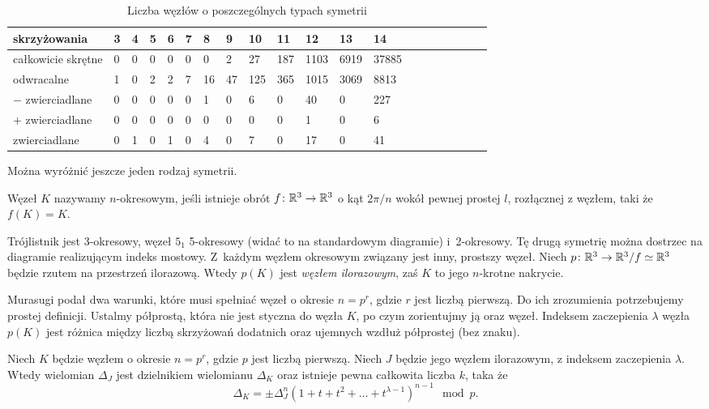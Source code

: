 \begin{table}[h]
    \centering
    \begin{tabular}{@{}*{20}l@{}} \toprule
        skrzyżowania & 3 & 4 & 5 & 6 & 7 & 8 & 9 & 10 & 11 & 12 & 13 & 14 \\ \midrule
        całkowicie skrętne & 0 & 0 & 0 & 0 & 0 & 0 & 2 & 27 & 187 & 1103 & 6919 & 37885 \\
        odwracalne & 1 & 0 & 2 & 2 & 7 & 16 & 47 & 125 & 365 & 1015 & 3069 & 8813 \\
        $-$ zwierciadlane & 0 & 0 & 0 & 0 & 0 & 1 & 0 & 6 & 0 & 40 & 0 & 227 \\
        $+$ zwierciadlane & 0 & 0 & 0 & 0 & 0 & 0 & 0 & 0 & 0 & 1 & 0 & 6 \\
        zwierciadlane & 0 & 1 & 0 & 1 & 0 & 4 & 0 & 7 & 0 & 17 & 0 & 41 \\
        \bottomrule
        \hline
    \end{tabular}
    \caption{Liczba węzłów o poszczególnych typach symetrii}
    \label{tablica_wezlow}
\end{table}

Można wyróżnić jeszcze jeden rodzaj symetrii.

\begin{definition}
    Węzeł $K$ nazywamy $n$-okresowym, jeśli istnieje obrót $f \colon \mathbb R^3 \to \mathbb R^3$ o kąt $2\pi/n$ wokół pewnej prostej $l$, rozłącznej z węzłem, taki że $f(K) = K$.
\end{definition}

Trójlistnik jest 3-okresowy, węzeł $5_1$ 5-okresowy (widać to na standardowym diagramie) i~2-okresowy.
Tę drugą symetrię można dostrzec na diagramie realizującym indeks mostowy.
Z~każdym węzłem okresowym związany jest inny, prostszy węzeł.
Niech $p \colon \mathbb R^3 \to \mathbb R^3/f \simeq \mathbb R^3$ będzie rzutem na przestrzeń ilorazową.
Wtedy $p(K)$ jest \emph{węzłem ilorazowym}, zaś $K$ to jego $n$-krotne nakrycie.

Murasugi podał dwa warunki, które musi spełniać węzeł o okresie $n = p^r$, gdzie $r$ jest liczbą pierwszą.
Do ich zrozumienia potrzebujemy prostej definicji.
Ustalmy półprostą, która nie jest styczna do węzła $K$, po czym zorientujmy ją oraz węzeł.
Indeksem zaczepienia $\lambda$ węzła $p(K)$ jest różnica między liczbą skrzyżowań dodatnich oraz ujemnych wzdłuż półprostej (bez znaku).

\begin{proposition}
    Niech $K$ będzie węzłem o okresie $n = p^r$, gdzie $p$ jest liczbą pierwszą.
    Niech $J$ będzie jego węzłem ilorazowym, z indeksem zaczepienia $\lambda$.
    Wtedy wielomian $\Delta_J$ jest dzielnikiem wielomianu $\Delta_K$ oraz istnieje pewna całkowita liczba $k$, taka że
    \[
        \Delta_K = \pm \Delta_J^n \left(1 + t + t^2 + \ldots + t^{\lambda - 1}\right)^{n-1} \mod p.
    \]
\end{proposition}

